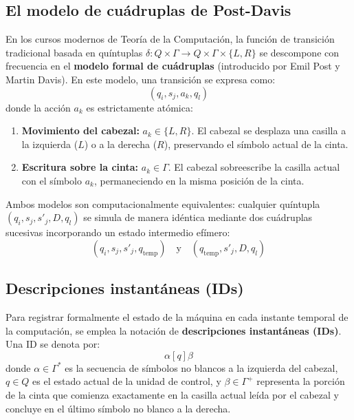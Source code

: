 \documentclass[11pt,letterpaper]{article}
\begin{document}
\subsection{El modelo de cuádruplas de Post-Davis}
En los cursos modernos de Teoría de la Computación, la función de transición tradicional basada en quíntuplas $\delta: Q \times \Gamma \to Q \times \Gamma \times \{L, R\}$ se descompone con frecuencia en el \textbf{modelo formal de cuádruplas} (introducido por Emil Post y Martin Davis). En este modelo, una transición se expresa como:
\begin{equation}
(q_i, s_j, a_k, q_l)
\end{equation}
donde la acción $a_k$ es estrictamente atómica:
\begin{enumerate}
    \item \textbf{Movimiento del cabezal:} $a_k \in \{L, R\}$. El cabezal se desplaza una casilla a la izquierda ($L$) o a la derecha ($R$), preservando el símbolo actual de la cinta.
    \item \textbf{Escritura sobre la cinta:} $a_k \in \Gamma$. El cabezal sobreescribe la casilla actual con el símbolo $a_k$, permaneciendo en la misma posición de la cinta.
\end{enumerate}

Ambos modelos son computacionalmente equivalentes: cualquier quíntupla $(q_i, s_j, s'_j, D, q_l)$ se simula de manera idéntica mediante dos cuádruplas sucesivas incorporando un estado intermedio efímero:
\begin{equation}
(q_i, s_j, s'_j, q_{\text{temp}}) \quad \text{y} \quad (q_{\text{temp}}, s'_j, D, q_l)
\end{equation}

\subsection{Descripciones instantáneas (IDs)}
Para registrar formalmente el estado de la máquina en cada instante temporal de la computación, se emplea la notación de \textbf{descripciones instantáneas (IDs)}. Una ID se denota por:
\begin{equation}
\alpha [q] \beta
\end{equation}
donde $\alpha \in \Gamma^*$ es la secuencia de símbolos no blancos a la izquierda del cabezal, $q \in Q$ es el estado actual de la unidad de control, y $\beta \in \Gamma^+$ representa la porción de la cinta que comienza exactamente en la casilla actual leída por el cabezal y concluye en el último símbolo no blanco a la derecha.
\end{document}
